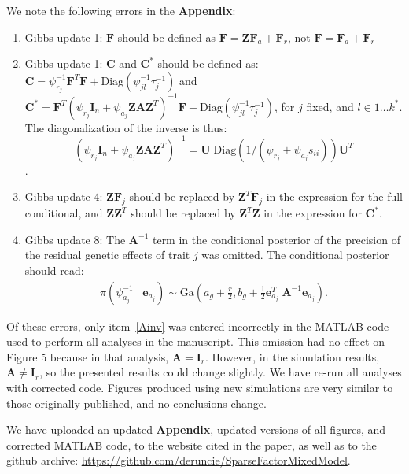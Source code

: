 \documentclass[11pt]{amsart}
\begin{document}

We note the following errors in the \textbf{Appendix}:

\begin{enumerate}
\item Gibbs update 1: $\textbf{F}$ should be defined as $\mathbf{F} = \mathbf{Z}\mathbf{F}_a + \mathbf{F}_r$, not $\mathbf{F} = \mathbf{F}_a + \mathbf{F}_r$

\item Gibbs update 1:  $\mathbf{C}$ and $\mathbf{C}^*$ should be defined as: $\mathbf{C} = \psi^{-1}_{r_j}\mathbf{F}^T\mathbf{F} + \mbox{Diag}(\psi^{-1}_{jl}\tau^{-1}_j)$ and $\mathbf{C}^* = \mathbf{F}^T(\psi_{r_j}\mathbf{I}_n + \psi_{a_j}\mathbf{ZAZ}^T)^{-1}\mathbf{F} + \mbox{Diag}(\psi^{-1}_{jl}\tau^{-1}_j)$, for $j$ fixed, and $l \in 1\dots k^*$. The diagonalization of the inverse is thus: $$(\psi_{r_j}\mathbf{I}_n + \psi_{a_j}\mathbf{ZAZ}^T)^{-1} = \mathbf{U}\;\mbox{Diag}(1/(\psi_{r_j} + \psi_{a_j}s_{ii}))\mathbf{U}^T$$.

\item Gibbs update 4: $\mathbf{ZF}_j$ should be replaced by $\mathbf{Z}^T\mathbf{F}_j$ in the expression for the full conditional, and $\mathbf{ZZ}^T$ should be replaced by $\mathbf{Z}^T\mathbf{Z}$ in the expression for $\mathbf{C}^*$.

\item \label{Ainv} Gibbs update 8: The $\mathbf{A}^{-1}$ term in the conditional posterior of the precision of the residual genetic effects of trait $j$ was omitted. The conditional posterior should read:
\begin{align*}
\pi(\psi^{-1}_{a_j}\mid \mathbf{e}_{a_j}) \sim \mbox{Ga}\left(a_g + \frac{r}{2},b_g + \frac{1}{2} \mathbf{e}^T_{a_j}\;\mathbf{A}^{-1} \mathbf{e}_{a_j}\right).
\end{align*}
\end{enumerate}

Of these errors, only item~\ref{Ainv} was entered incorrectly in the MATLAB code used to perform all analyses in the manuscript. This omission had no effect on Figure 5 because in that analysis, $\mathbf{A} = \mathbf{I}_r$. However, in the simulation results, $\mathbf{A} \neq \mathbf{I}_r$, so the presented results could change slightly. We have re-run all analyses with corrected code. Figures produced using new simulations are very similar to those originally published, and no conclusions change.

We have uploaded an updated \textbf{Appendix}, updated versions of all figures, and corrected MATLAB code, to the website cited in the paper, as well as to the github archive: \url{https://github.com/deruncie/SparseFactorMixedModel}.
\end{document}
